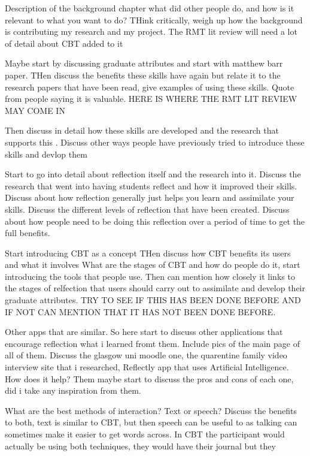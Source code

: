 \documentclass{l4proj}
\begin{document}
Description of the background chapter
what did other people do, and how is it relevant to what you want to do?
THink critically, weigh up how the background is contributing my research and my project.
The RMT lit review will need a lot of detail about CBT added to it
\par 
Maybe start by discussing graduate attributes and start with matthew barr paper. 
THen discuss the benefits these skills have again but relate it to the research papers that have been 
read, give examples of using these skills. Quote from people saying it is valuable.
HERE IS WHERE THE RMT LIT REVIEW MAY COME IN
\par 
Then discuss in detail how these skills are developed and the research that supports this .
Discuss other ways people have previously tried to introduce these skills and devlop them 
\par 
Start to go into detail about reflection itself and the research into it.
Discuss the research that went into having students reflect and how it improved their skills. Discuss about
how reflection generally just helps you learn and assimilate your skills. 
Discuss the different levels of reflection that have been created.
Discuss about how people need to be doing this reflection over a period of time to get the full benefits.
\par 
Start introducing CBT as a concept
THen discuss how CBT benefits its users and what it involves
What are the stages of CBT and how do people do it, start introducing the tools that people use.
Then can mention how closely it links to the stages of relfection that users should carry out to 
assimilate and develop their graduate attributes. 
TRY TO SEE IF THIS HAS BEEN DONE BEFORE AND IF NOT CAN MENTION THAT IT HAS NOT BEEN DONE BEFORE. 
\par 
Other apps that are similar. So here start to discuss other applications that encourage reflection 
what i learned fromt them.
Include pics of the main page of all of them.
Discuss the glasgow uni moodle one, the quarentine family video interview site that i researched,
Reflectly app that uses Artificial Intelligence. How does it help? Them maybe start to discuss the pros and 
cons of each one, did i take any inspiration from them. 
\par 
What are the best methods of interaction? Text or speech? Discuss the benefits to both, text is similar 
to CBT, but then speech can be useful to as talking can sometimes make it easier to get words across. In
CBT the participant would actually be using both techniques, they would have their journal but they 
\end{document}
